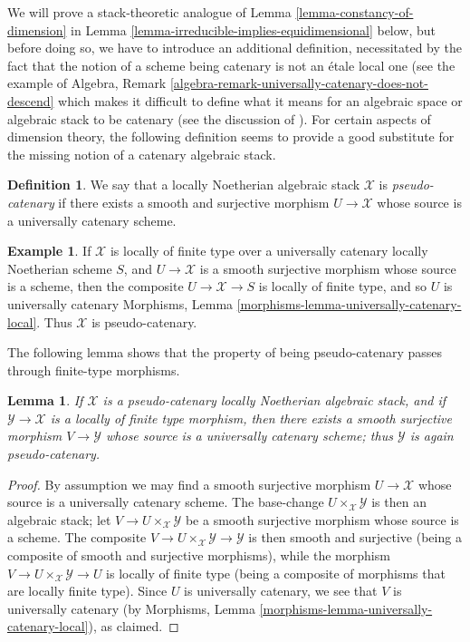 \documentclass{stacks-project}
\theoremstyle{plain}
\newtheorem{lemma}[subsection]{Lemma}
\theoremstyle{definition}
\newtheorem{definition}[subsection]{Definition}
\newtheorem{example}[subsection]{Example}
\theoremstyle{remark}
\numberwithin{equation}{subsection}
\begin{document}
\noindent
We will prove a stack-theoretic analogue
of Lemma \ref{lemma-constancy-of-dimension}
in Lemma \ref{lemma-irreducible-implies-equidimensional} below,
but before doing so, we have to introduce an additional definition,
necessitated by the fact that the notion of a scheme being catenary
is not an \'etale local one
(see the example of
Algebra, Remark \ref{algebra-remark-universally-catenary-does-not-descend}
which makes it difficult to define what it means for an algebraic
space or algebraic stack to be catenary
(see the discussion of \cite[page 3]{Osserman}).
For certain aspects of dimension theory, the following
definition seems to provide a good substitute for the missing
notion of a catenary algebraic stack.

\begin{definition}
\label{definition-pseudo-catenary}
We say that a locally Noetherian algebraic stack $\mathcal{X}$
is {\it pseudo-catenary} if there exists a smooth
and surjective morphism $U \to \mathcal{X}$ whose source is
a universally catenary scheme.
\end{definition}

\begin{example}
\label{example-pseudo-catenary}
If $\mathcal{X}$ is locally of finite type over a universally
catenary locally Noetherian scheme $S$,
and $U\to \mathcal{X}$ is a smooth surjective morphism
whose source is a scheme, then the composite
$U \to \mathcal{X} \to S$ is locally of finite type,
and so $U$ is universally catenary
Morphisms, Lemma
\ref{morphisms-lemma-universally-catenary-local}.
Thus $\mathcal{X}$ is pseudo-catenary.
\end{example}

\noindent
The following lemma shows that the property of being pseudo-catenary
passes through finite-type morphisms.

\begin{lemma}
\label{lemma-catenary-covers}
If $\mathcal{X}$ is a pseudo-catenary locally Noetherian algebraic
stack, and if $\mathcal{Y} \to \mathcal{X}$ is a locally of finite type
morphism,
then there exists a smooth surjective morphism $V \to \mathcal{Y}$
whose source is a universally catenary scheme; thus
$\mathcal{Y}$ is again pseudo-catenary.
\end{lemma}

\begin{proof}
By assumption we may find a smooth surjective morphism
$U \to \mathcal{X}$ whose source is a universally catenary scheme.
The base-change $U\times_{\mathcal{X}} \mathcal{Y}$ is then an algebraic
stack; let $V \to U\times_{\mathcal{X}} \mathcal{Y}$ be a smooth
surjective morphism whose source is a scheme.
The composite $V \to U\times_{\mathcal{X}} \mathcal{Y} \to \mathcal{Y}$ is then
smooth and surjective (being a composite of smooth and
surjective morphisms), while the morphism $V \to U\times_{\mathcal{X}}
\mathcal{Y} \to U$ is locally of finite type (being a composite
of morphisms that are locally finite type).  Since $U$
is universally catenary, we see that $V$ is universally catenary
(by Morphisms, Lemma
\ref{morphisms-lemma-universally-catenary-local}),
as claimed.
\end{proof}
\end{document}
